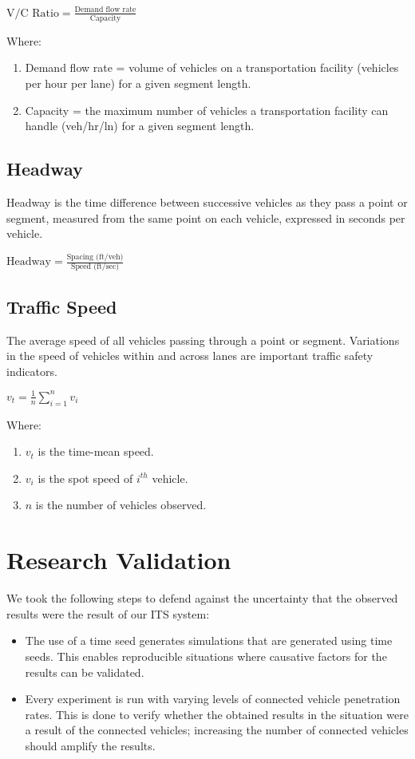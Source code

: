 \(\text{V/C Ratio}=\frac{\text{Demand flow rate}}{\text{Capacity}}\)

Where:
\begin{enumerate} 
\item Demand flow rate = volume of vehicles on a transportation facility (vehicles per hour per lane) for a given segment length.
\item Capacity = the maximum number of vehicles a transportation facility can handle (veh/hr/ln) for a given segment length.
\end{enumerate}

\subsection{Headway}

Headway is the time difference between successive vehicles as they pass a point or segment, measured from the same point on each vehicle, expressed in seconds per vehicle.

\(\text{Headway}=\frac{\text{Spacing (ft/veh)}}{\text{Speed (ft/sec)}}\)

\subsection{Traffic Speed}

The average speed of all vehicles passing through a point or segment. Variations in the speed of vehicles within and across lanes are important traffic safety indicators.

\(v_t=\frac{1}{n}\sum^{n}_{i=1}{v_i}\)

Where:
\begin{enumerate}
\item \(v_t\) is the time-mean speed.
\item \(v_i\) is the spot speed of \(i^{th}\) vehicle.
\item \(n\) is the number of vehicles observed.
\end{enumerate}

\section{Research Validation}

We took the following steps to defend against the uncertainty that the observed results were the result of our \acrshort{ITS} system:
\begin{itemize}
\item The use of a time seed generates simulations that are generated using time seeds. This enables reproducible situations where causative factors for the results can be validated.
\item Every experiment is run with varying levels of connected vehicle penetration rates. This is done to verify whether the obtained results in the situation were a result of the connected vehicles; increasing the number of connected vehicles should amplify the results.
\end{itemize}

